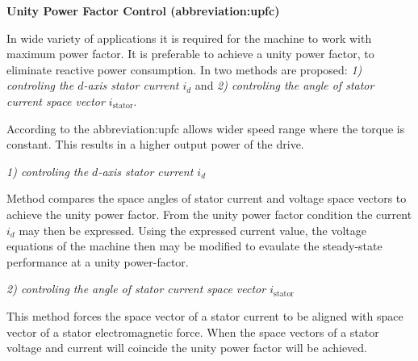 \documentclass[a4paper, twoside, 11pt]{article}
\begin{document}
            \vspace*{1.5cm}
             \hspace*{-\parindent} \textbf{Unity Power Factor Control (\gls{abbreviation:upfc})}\par
             \hspace*{\parindent} In wide variety of applications it is required for the machine to work with maximum power factor. It is preferable to achieve a unity power factor, to eliminate reactive power consumption. In \cite{moussa-unity-power-factor-control-of-permanent-magnet-motor-drive-system} two methods are proposed: \textit{1) controling the $d$-axis stator current $i_d$} and \textit{2) controling the angle of stator current space vector $i_\text{stator}$}.\par
             According to \cite{moussa-unity-power-factor-control-of-permanent-magnet-motor-drive-system} the \gls{abbreviation:upfc} allows wider speed range where the torque is constant. This results in a higher output power of the drive.\par

             \vspace*{1cm}
             \textit{1) controling the $d$-axis stator current $i_d$}\par
             \hspace*{\parindent} Method compares the space angles of stator current and voltage space vectors to achieve the unity power factor. From the unity power factor condition the current $i_d$ may then be expressed. Using the expressed current value, the voltage equations of the machine then may be modified to evaulate the steady-state performance at a unity power-factor. \cite{moussa-unity-power-factor-control-of-permanent-magnet-motor-drive-system}

             \vspace*{1cm}
             \textit{2) controling the angle of stator current space vector $i_\text{stator}$}\par
             \hspace*{\parindent} This method forces the space vector of a stator current to be aligned with space vector of a stator electromagnetic force. When the space vectors of a stator voltage and current will coincide the unity power factor will be achieved. \cite{moussa-unity-power-factor-control-of-permanent-magnet-motor-drive-system}
\end{document}
